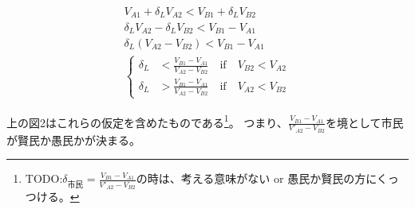 \documentclass[main.tex]{subfiles}
\begin{document}
\begin{align*}
  V_{A1} + \delta_L V_{A2} < V_{B1} + \delta_L V_{B2} \\
  \delta_L V_{A2} - \delta_L V_{B2} < V_{B1} - V_{A1} \\
  \delta_L (V_{A2} - V_{B2}) < V_{B1} - V_{A1} \\
  \begin{cases}
    \delta_L &< \frac{V_{B1}-V_{A1}}{V_{A2} - V_{B2}} \quad\text{if}\quad V_{B2} < V_{A2}\\
    \delta_L &> \frac{V_{B1}-V_{A1}}{V_{A2} - V_{B2}} \quad\text{if}\quad V_{A2} < V_{B2}
  \end{cases}
\end{align*}

\bigskip
上の図2はこれらの仮定を含めたものである\footnote{TODO:$\delta_{市民} = \frac{V_{B1} - V_{A1}}{V'_{A2} - V_{B2}}$の時は、考える意味がない or 愚民か賢民の方にくっつける。}。
つまり、$\frac{V_{B1} - V_{A1}}{V'_{A2} - V_{B2}}$を境として市民が賢民か愚民かが決まる。 






\theendnotes
\end{document}
